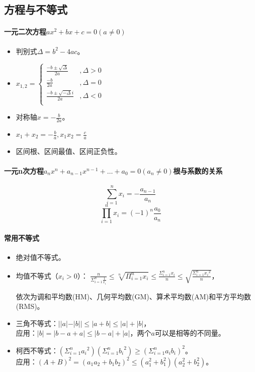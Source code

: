 \documentclass[
12pt, %
a4paper, 
oneside, %
headinclude,footinclude, %
]{scrartcl}
\begin{document}
\subsection{方程与不等式}
\paragraph{一元二次方程$ ax^2 + bx + c = 0(a \neq 0) $}
\begin{itemize}
\item 判别式$ \varDelta = b^2 - 4ac $。
\item 
$
x_{1,2}=
\begin{cases}
\frac{-b \pm \sqrt{\varDelta}}{2a} &, \varDelta > 0 \\
\frac{-b}{2a} &, \varDelta = 0 \\
\frac{-b \pm \sqrt{-\varDelta}i}{2a} &, \varDelta < 0 \\
\end{cases}
$
\item 对称轴$ x = -\frac{b}{2a} $。
\item $ x_1 + x_2 = -\frac{b}{a}, x_1 x_2 = \frac{c}{a} $
\item 区间根、区间最值、区间正负性。
\end{itemize}
\paragraph{一元n次方程$ a_n x^n + a_{n - 1} x^{n - 1} + \dots + a_0 = 0 (a_n \neq 0) $根与系数的关系}
$$ \sum_{i = 1}^{n}x_i = -\frac{a_{n - 1}}{a_n} $$
$$ \prod_{i = 1}^{n}x_i = (-1)^n \frac{a_0}{a_n} $$ 
\paragraph{常用不等式}
\begin{itemize}
\item 绝对值不等式。
\item 均值不等式（$ x_i > 0 $）：
$
\frac{n}{\Sigma_{i = 1}^n \frac{1}{x_i}}
\leq \sqrt[n]{\Pi_{i = 1}^n x_i}
\leq \frac{\Sigma_{i = 1}^n x_i}{n}
\leq \sqrt{\frac{\Sigma_{i = 1}^n {x_i}^2}{n}}
$，

依次为调和平均数(HM)、几何平均数(GM)、算术平均数(AM)和平方平均数(RMS)。
\item 三角不等式：$ ||a|-|b|| \leq |a + b| \leq |a| + |b|$， \\
应用：$ |b| = |b - a + a| \leq |b - a| + |a| $，两个$ a $可以是相等的不同量。
\item 柯西不等式：$ (\Sigma_{i = 1}^n {a_i}^2)(\Sigma_{i = 1}^n {b_i}^2)\geq (\Sigma_{i=1}^n {a_i}{b_i})^2 $。 \\
应用：$ (A + B)^2 = (a_1 a_2 + b_1 b_2)^2 \leq (a_1^2 + b_1^2)(a_2^2 + b_2^2) $。
\end{itemize}
\end{document}
